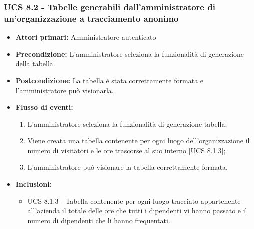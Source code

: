 \subsubsection{UCS 8.2 - Tabelle generabili dall'amministratore di un'organizzazione a tracciamento anonimo}%
\begin{itemize}
\item \textbf{Attori primari:} Amministratore autenticato
\item \textbf{Precondizione:} L'amministratore seleziona la funzionalità di generazione della tabella.
\item \textbf{Postcondizione:} La tabella è stata correttamente formata e l'amministratore può visionarla.
\item \textbf{Flusso di eventi:}
	\begin{enumerate}%
	\item L'amministratore seleziona la funzionalità di generazione tabella;
	\item Viene creata una tabella contenente per ogni luogo dell'organizzazione il numero di visitatori e le ore trascorse al suo interno [UCS 8.1.3];
	\item L'amministratore può visionare la tabella correttamente formata.
\end{enumerate}
\item \textbf{Inclusioni:} 
\begin{itemize}
		\item UCS 8.1.3 - Tabella contenente per ogni luogo tracciato appartenente all'azienda il totale delle ore che tutti i dipendenti vi hanno passato e il numero di dipendenti che li hanno frequentati.
	\end{itemize}
\end{itemize}
